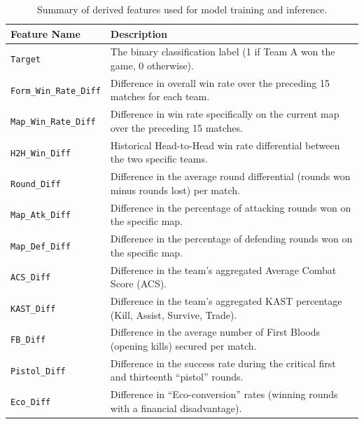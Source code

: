 \begin{table}[H]
    \centering
    \small
    \begin{tabular}{l>{\raggedright\arraybackslash}p{10cm}}
        \toprule
        \textbf{Feature Name} & \textbf{Description} \\
        \midrule
        \texttt{Target} & The binary classification label (1 if Team A won the game, 0 otherwise). \\
        \midrule
        \texttt{Form\_Win\_Rate\_Diff} & Difference in overall win rate over the preceding 15 matches for each team. \\
        \midrule
        \texttt{Map\_Win\_Rate\_Diff} & Difference in win rate specifically on the current map over the preceding 15 matches. \\
        \midrule
        \texttt{H2H\_Win\_Diff} & Historical Head-to-Head win rate differential between the two specific teams. \\
        \midrule
        \texttt{Round\_Diff} & Difference in the average round differential (rounds won minus rounds lost) per match. \\
        \midrule
        \texttt{Map\_Atk\_Diff} & Difference in the percentage of attacking rounds won on the specific map. \\
        \midrule
        \texttt{Map\_Def\_Diff} & Difference in the percentage of defending rounds won on the specific map. \\
        \midrule
        \texttt{ACS\_Diff} & Difference in the team's aggregated Average Combat Score (ACS). \\
        \midrule
        \texttt{KAST\_Diff} & Difference in the team's aggregated KAST percentage (Kill, Assist, Survive, Trade). \\
        \midrule
        \texttt{FB\_Diff} & Difference in the average number of First Bloods (opening kills) secured per match. \\
        \midrule
        \texttt{Pistol\_Diff} & Difference in the success rate during the critical first and thirteenth ``pistol'' rounds. \\
        \midrule
        \texttt{Eco\_Diff} & Difference in ``Eco-conversion'' rates (winning rounds with a financial disadvantage). \\
        \bottomrule
    \end{tabular}
    \caption{Summary of derived features used for model training and inference.}
    \label{tab:finalFeatureSummary}
\end{table}

